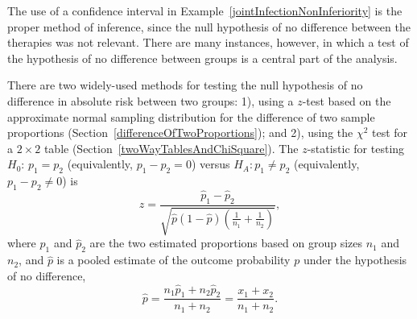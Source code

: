 The use of a confidence interval in Example~\ref{jointInfectionNonInferiority} is the proper method of inference, since the null hypothesis of no difference between the therapies was not relevant.  There are many instances, however, in which a test of the hypothesis of no difference between groups is a central part of the analysis.

There are two widely-used methods for testing the null hypothesis of no difference in absolute risk between two groups: 1), using a $z$-test based on the approximate normal sampling distribution for the difference of two sample proportions (Section~\ref{differenceOfTwoProportions}); and 2), using the $\chi^2$ test for a $2 \times 2$ table (Section~\ref{twoWayTablesAndChiSquare}).   The $z$-statistic for testing $H_0:\, p_1 = p_2$ (equivalently, $p_1 - p_2 = 0$) versus $H_A: p_1 \neq p_2$ (equivalently, $p_1 - p_2 \neq 0$) is
\[z = \dfrac{\hat{p}_1 - \hat{p}_2}{\sqrt{\hat{p}(1-\hat{p})\left(\frac{1}{n_1} + \frac{1}{n_2} \right)}}, \]
where $\hat{p}_1$ and $\hat{p}_2$ are the two estimated proportions based on group sizes $n_1$ and $n_2$, and $\hat{p}$ is a pooled estimate of the outcome probability $p$ under the hypothesis of no difference,
\[\hat{p} = \dfrac{n_{1}\hat{p}_1 + n_{2}\hat{p}_2}{n_{1} + n_{2}} = \dfrac{x_{1} + x_{2}}{n_{1} + n_{2}}. \]


